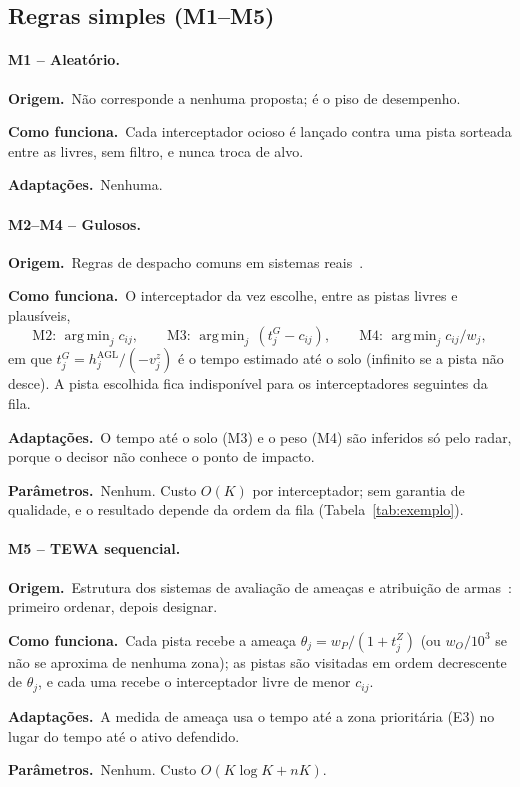 \documentclass[11pt,a4paper]{article}
\newcommand{\orig}{\par\noindent\textbf{Origem.}~}
\newcommand{\func}{\par\noindent\textbf{Como funciona.}~}
\newcommand{\adap}{\par\noindent\textbf{Adaptações.}~}
\newcommand{\parm}{\par\noindent\textbf{Parâmetros.}~}
\DeclareMathOperator*{\argmin}{arg\,min}
\begin{document}
\subsection{Regras simples (M1--M5)}

\paragraph{M1 -- Aleatório.}
\orig Não corresponde a nenhuma proposta; é o piso de desempenho.
\func Cada interceptador ocioso é lançado contra uma pista sorteada entre as livres, sem filtro, e nunca troca de alvo.
\adap Nenhuma.

\paragraph{M2--M4 -- Gulosos.}
\orig Regras de despacho comuns em sistemas reais~\cite{roux2007,kline2019}.
\func O interceptador da vez escolhe, entre as pistas livres e plausíveis,
\begin{equation}
  \text{M2: }\argmin_j c_{ij},\qquad
  \text{M3: }\argmin_j\,(t^G_j-c_{ij}),\qquad
  \text{M4: }\argmin_j c_{ij}/w_j,
\end{equation}
em que $t^G_j=h_j^{\mathrm{AGL}}/(-v_j^z)$ é o tempo estimado até o solo (infinito se a pista não desce). A pista
escolhida fica indisponível para os interceptadores seguintes da fila.
\adap O tempo até o solo (M3) e o peso (M4) são inferidos só pelo radar, porque o decisor não conhece o ponto de impacto.
\parm Nenhum. Custo $O(K)$ por interceptador; sem garantia de qualidade, e o resultado depende da ordem da fila
(Tabela~\ref{tab:exemplo}).

\paragraph{M5 -- TEWA sequencial.}
\orig Estrutura dos sistemas de avaliação de ameaças e atribuição de armas~\cite{roux2007}: primeiro ordenar, depois
designar.
\func Cada pista recebe a ameaça $\theta_j=w_P/(1+t^Z_j)$ (ou $w_O/10^3$ se não se aproxima de nenhuma zona); as pistas
são visitadas em ordem decrescente de $\theta_j$, e cada uma recebe o interceptador livre de menor $c_{ij}$.
\adap A medida de ameaça usa o tempo até a zona prioritária (E3) no lugar do tempo até o ativo defendido.
\parm Nenhum. Custo $O(K\log K+nK)$.

\end{document}
